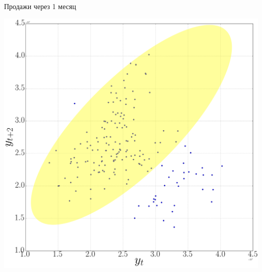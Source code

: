 \documentclass[9pt,pdf,utf8,hyperref={unicode},aspectratio=169]{beamer}
\begin{document}
\begin{frame}{Продажи через 1 месяц}
	\begin{center}
		\includegraphics[height=0.6\textheight]{wine7.png}
	\end{center}
\end{frame}
\end{document}
